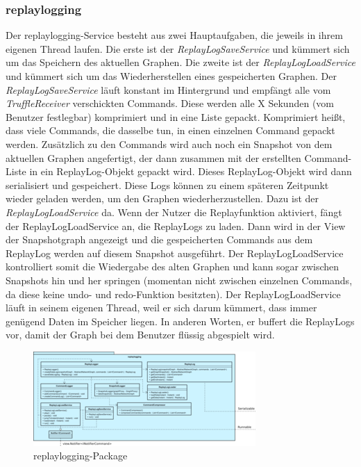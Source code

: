     \subsubsection{replaylogging}
    \label{subsubsec:replaylogging}

    Der replaylogging-Service besteht aus zwei Hauptaufgaben, die jeweils in ihrem eigenen Thread laufen.
    Die erste ist der \textit{ReplayLogSaveService} und kümmert sich um das Speichern des aktuellen
    Graphen. Die zweite ist der \textit{ReplayLogLoadService} und kümmert sich um das
    Wiederherstellen eines gespeicherten Graphen.
    \newline
    \newline
    Der \textit{ReplayLogSaveService} läuft konstant im Hintergrund und empfängt alle
    vom \textit{TruffleReceiver} verschickten Commands. Diese werden alle X
    Sekunden (vom Benutzer festlegbar) komprimiert und in eine Liste gepackt.
    Komprimiert heißt, dass viele Commands, die dasselbe tun, in einen einzelnen Command
    gepackt werden. Zusätzlich zu den Commands wird auch noch ein Snapshot
    von dem aktuellen Graphen angefertigt, der dann zusammen mit der erstellten
    Command-Liste in ein ReplayLog-Objekt gepackt wird. Dieses
    ReplayLog-Objekt wird dann serialisiert und gespeichert.
    \newline
    \newline
    Diese Logs können zu einem späteren Zeitpunkt wieder geladen werden, um den
    Graphen wiederherzustellen. Dazu ist der \textit{ReplayLogLoadService} da. Wenn
    der Nutzer die Replayfunktion aktiviert, fängt der ReplayLogLoadService an, die
    ReplayLogs zu laden. Dann wird in der View der Snapshotgraph angezeigt
    und die gespeicherten Commands aus dem ReplayLog werden auf
    diesem Snapshot ausgeführt. Der ReplayLogLoadService kontrolliert somit die
    Wiedergabe des alten Graphen und kann sogar zwischen Snapshots hin und her
    springen (momentan nicht zwischen einzelnen Commands, da diese keine undo-
    und redo-Funktion besitzten).
    \newline
    \newline
    Der ReplayLogLoadService läuft in seinem eigenen Thread, weil er sich darum
    kümmert, dass immer genügend Daten im Speicher liegen. In anderen Worten, er
    buffert die ReplayLogs vor, damit der Graph bei dem Benutzer flüssig
    abgespielt wird.

    \clearpage
    \begin{figure}
      \centering
      \includegraphics[width=\textwidth]{../diagramimages/replaylogging.png}
      \caption{replaylogging-Package}
    \end{figure}
    \clearpage

